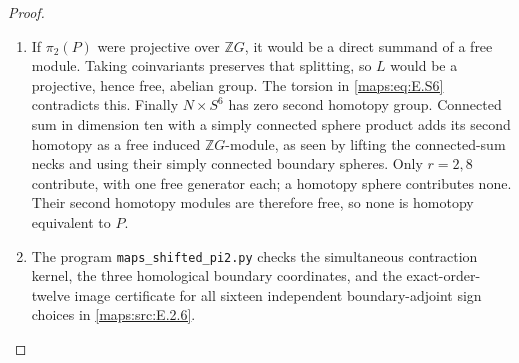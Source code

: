 \begin{proof}
\begin{enumerate}[label={$\langle1\rangle$\arabic*.},leftmargin=*]
\item If $\pi_2(P)$ were projective over $\mathbb ZG$, it would be
a direct summand of a free module. Taking coinvariants preserves
that splitting, so $L$ would be a projective, hence free,
abelian group. The torsion in \eqref{maps:eq:E.S6} contradicts this. Finally
$N\times S^6$ has zero second homotopy group. Connected sum in
dimension ten with a simply connected sphere product adds its
second homotopy as a free induced $\mathbb ZG$-module, as seen
by lifting the connected-sum necks and using their simply
connected boundary spheres. Only $r=2,8$ contribute, with one
free generator each; a homotopy sphere contributes none.
Their second homotopy modules are therefore free, so none is
homotopy equivalent to $P$.

\item The program \texttt{maps\_shifted\_pi2.py} checks the simultaneous
contraction kernel, the three homological boundary coordinates,
and the exact-order-twelve image certificate for all sixteen
independent boundary-adjoint sign choices in \ref{maps:src:E.2.6}.
\end{enumerate}
\end{proof}

